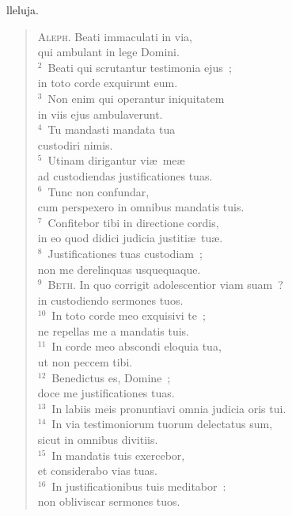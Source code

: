 \bchapter
{}lleluja. \begin{flushleft}\begin{verse}\vspace{6pt}\textsc{Aleph.} Beati immaculati in via,\\ qui ambulant in lege Domini.\\
${}^{2}$~Beati qui scrutantur testimonia ejus~;\\ in toto corde exquirunt eum.\\
${}^{3}$~Non enim qui operantur iniquitatem\\ in viis ejus ambulaverunt.\\
${}^{4}$~Tu mandasti mandata tua\\ custodiri nimis.\\
${}^{5}$~Utinam dirigantur vi\ae\ me\ae \\ ad custodiendas justificationes tuas.\\
${}^{6}$~Tunc non confundar,\\ cum perspexero in omnibus mandatis tuis.\\
${}^{7}$~Confitebor tibi in directione cordis,\\ in eo quod didici judicia justiti\ae\ tu\ae .\\
${}^{8}$~Justificationes tuas custodiam~;\\ non me derelinquas usquequaque.\\
${}^{9}$~\textsc{Beth.} In quo corrigit adolescentior viam suam~?\\ in custodiendo sermones tuos.\\
${}^{10}$~In toto corde meo exquisivi te~;\\ ne repellas me a mandatis tuis.\\
${}^{11}$~In corde meo abscondi eloquia tua,\\ ut non peccem tibi.\\
${}^{12}$~Benedictus es, Domine~;\\ doce me justificationes tuas.\\
${}^{13}$~In labiis meis pronuntiavi omnia judicia oris tui.\\
${}^{14}$~In via testimoniorum tuorum delectatus sum,\\ sicut in omnibus divitiis.\\
${}^{15}$~In mandatis tuis exercebor,\\ et considerabo vias tuas.\\
${}^{16}$~In justificationibus tuis meditabor~:\\ non obliviscar sermones tuos.\\

\end{verse}
\end{flushleft}
